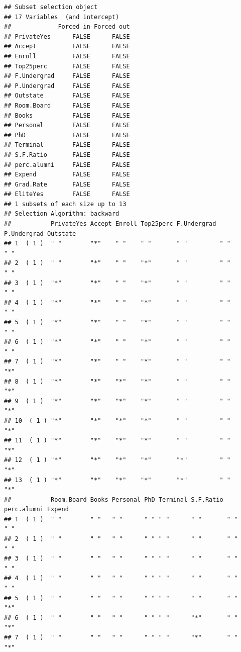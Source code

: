\documentclass[]{article}
\begin{document}
\begin{verbatim}
## Subset selection object
## 17 Variables  (and intercept)
##             Forced in Forced out
## PrivateYes      FALSE      FALSE
## Accept          FALSE      FALSE
## Enroll          FALSE      FALSE
## Top25perc       FALSE      FALSE
## F.Undergrad     FALSE      FALSE
## P.Undergrad     FALSE      FALSE
## Outstate        FALSE      FALSE
## Room.Board      FALSE      FALSE
## Books           FALSE      FALSE
## Personal        FALSE      FALSE
## PhD             FALSE      FALSE
## Terminal        FALSE      FALSE
## S.F.Ratio       FALSE      FALSE
## perc.alumni     FALSE      FALSE
## Expend          FALSE      FALSE
## Grad.Rate       FALSE      FALSE
## EliteYes        FALSE      FALSE
## 1 subsets of each size up to 13
## Selection Algorithm: backward
##           PrivateYes Accept Enroll Top25perc F.Undergrad P.Undergrad Outstate
## 1  ( 1 )  " "        "*"    " "    " "       " "         " "         " "     
## 2  ( 1 )  " "        "*"    " "    "*"       " "         " "         " "     
## 3  ( 1 )  "*"        "*"    " "    "*"       " "         " "         " "     
## 4  ( 1 )  "*"        "*"    " "    "*"       " "         " "         " "     
## 5  ( 1 )  "*"        "*"    " "    "*"       " "         " "         " "     
## 6  ( 1 )  "*"        "*"    " "    "*"       " "         " "         " "     
## 7  ( 1 )  "*"        "*"    " "    "*"       " "         " "         "*"     
## 8  ( 1 )  "*"        "*"    "*"    "*"       " "         " "         "*"     
## 9  ( 1 )  "*"        "*"    "*"    "*"       " "         " "         "*"     
## 10  ( 1 ) "*"        "*"    "*"    "*"       " "         " "         "*"     
## 11  ( 1 ) "*"        "*"    "*"    "*"       " "         " "         "*"     
## 12  ( 1 ) "*"        "*"    "*"    "*"       "*"         " "         "*"     
## 13  ( 1 ) "*"        "*"    "*"    "*"       "*"         " "         "*"     
##           Room.Board Books Personal PhD Terminal S.F.Ratio perc.alumni Expend
## 1  ( 1 )  " "        " "   " "      " " " "      " "       " "         " "   
## 2  ( 1 )  " "        " "   " "      " " " "      " "       " "         " "   
## 3  ( 1 )  " "        " "   " "      " " " "      " "       " "         " "   
## 4  ( 1 )  " "        " "   " "      " " " "      " "       " "         " "   
## 5  ( 1 )  " "        " "   " "      " " " "      " "       " "         "*"   
## 6  ( 1 )  " "        " "   " "      " " " "      "*"       " "         "*"   
## 7  ( 1 )  " "        " "   " "      " " " "      "*"       " "         "*"   

\end{verbatim}
\end{document}
